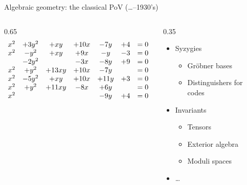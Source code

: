 \documentclass[aspectratio=169]{beamer}
\begin{document}
\begin{frame}{Algebraic geometry: the classical PoV (\dots--1930's)}
  \large
  \begin{columns}
    \begin{column}{0.65\textwidth}
      \centering
      \[
        \begin{array}{c c c c c c c }
          x^2 & + 3y^2 & + xy & + 10x & -7y & +4 & = 0\\
          x^2 & - y^2 & + xy & + 9x & -y & -3 & = 0\\
                 & - 2y^2 &  & -3x & -8y & +9 & = 0\\
          x^2 & + y^2 & + 13xy & + 10x & -7y &  & = 0\\
          x^2 & - 5y^2 & + xy & + 10x & +11y & +3 & = 0\\
          x^2 & + y^2 & + 11xy & - 8x & +6y &  & = 0\\
          x^2 &  &  &  & -9y & +4 & = 0\\
        \end{array}
      \]
    \end{column}
    \begin{column}{0.35\textwidth}
      \centering
      \begin{itemize}
        \setlength{\itemsep}{1em}
      \item Syzygies
        \begin{itemize}
        \item Gröbner bases
        \item Distinguishers for codes
        \end{itemize}
      \item Invariants
        \begin{itemize}
        \item Tensors
        \item Exterior algebra
        \item Moduli spaces
        \end{itemize}
      \item \dots
      \end{itemize}
    \end{column}
  \end{columns}
\end{frame}

\end{document}
